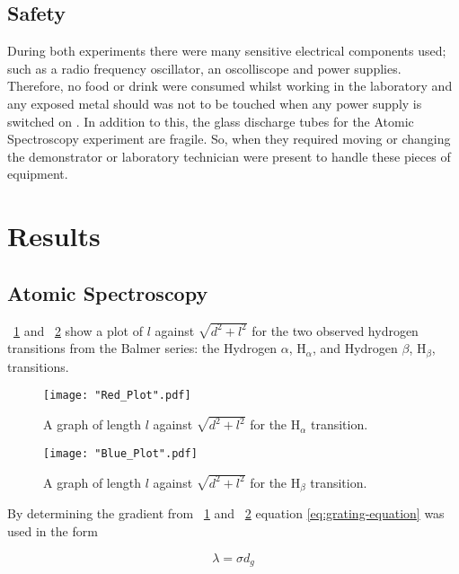 \documentclass{article}
\newcommand{\figref}[2][\figurename~]{#1\ref{#2}}
\begin{document}
\subsection{Safety}
\label{ssec:safety}
During both experiments there were many sensitive electrical components used; such as a radio frequency oscillator, an oscolliscope and power supplies. Therefore, no food or drink were consumed whilst working in the laboratory and any exposed metal should was not to be touched when any power supply is switched on \cite{Paper01}. In addition to this, the glass discharge tubes for the Atomic Spectroscopy experiment are fragile. So, when they required moving or changing the demonstrator or laboratory technician were present to handle these pieces of equipment. 


\section{Results}
\label{sec:results}

\subsection{Atomic Spectroscopy}
\label{ssec:atomic-results}

\figref{fig:Red_Plot} and \figref{fig:Blue_Plot} show a plot of $l$ against $\sqrt{d^2+l^2}$ for the two observed hydrogen transitions from the Balmer series: the Hydrogen $\alpha$, H$_\alpha$, and Hydrogen $\beta$, H$_\beta$, transitions.

\begin{figure}[h]
\centering
\texttt{[image: "Red\_Plot".pdf]}
\caption{A graph of length $l$ against $\sqrt{d^2+l^2}$ for the H$_\alpha$ transition.}
\label{fig:Red_Plot}
\end{figure}

\begin{figure}[h]
\centering
\texttt{[image: "Blue\_Plot".pdf]}
\caption{A graph of length $l$ against $\sqrt{d^2+l^2}$ for the H$_\beta$ transition.}
\label{fig:Blue_Plot}
\end{figure}

\newpage
\vspace{2mm}
\noindent
By determining the gradient from \figref{fig:Red_Plot} and \figref{fig:Blue_Plot} equation \eqref{eq:grating-equation} was used in the form 

\begin{equation}
\label{eq:wavelength}
\lambda = \sigma d_g
\end{equation}
\end{document}
